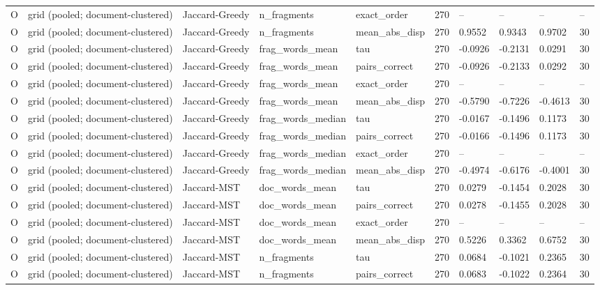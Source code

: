 \begin{table}[t]
{\begin{tabular}{llllllllll}
O & grid (pooled; document-clustered) & Jaccard-Greedy & n\_fragments & exact\_order & 270 & -- & -- & -- & -- \\
O & grid (pooled; document-clustered) & Jaccard-Greedy & n\_fragments & mean\_abs\_disp & 270 & 0.9552 & 0.9343 & 0.9702 & 30 \\
O & grid (pooled; document-clustered) & Jaccard-Greedy & frag\_words\_mean & tau & 270 & -0.0926 & -0.2131 & 0.0291 & 30 \\
O & grid (pooled; document-clustered) & Jaccard-Greedy & frag\_words\_mean & pairs\_correct & 270 & -0.0926 & -0.2133 & 0.0292 & 30 \\
O & grid (pooled; document-clustered) & Jaccard-Greedy & frag\_words\_mean & exact\_order & 270 & -- & -- & -- & -- \\
O & grid (pooled; document-clustered) & Jaccard-Greedy & frag\_words\_mean & mean\_abs\_disp & 270 & -0.5790 & -0.7226 & -0.4613 & 30 \\
O & grid (pooled; document-clustered) & Jaccard-Greedy & frag\_words\_median & tau & 270 & -0.0167 & -0.1496 & 0.1173 & 30 \\
O & grid (pooled; document-clustered) & Jaccard-Greedy & frag\_words\_median & pairs\_correct & 270 & -0.0166 & -0.1496 & 0.1173 & 30 \\
O & grid (pooled; document-clustered) & Jaccard-Greedy & frag\_words\_median & exact\_order & 270 & -- & -- & -- & -- \\
O & grid (pooled; document-clustered) & Jaccard-Greedy & frag\_words\_median & mean\_abs\_disp & 270 & -0.4974 & -0.6176 & -0.4001 & 30 \\
O & grid (pooled; document-clustered) & Jaccard-MST & doc\_words\_mean & tau & 270 & 0.0279 & -0.1454 & 0.2028 & 30 \\
O & grid (pooled; document-clustered) & Jaccard-MST & doc\_words\_mean & pairs\_correct & 270 & 0.0278 & -0.1455 & 0.2028 & 30 \\
O & grid (pooled; document-clustered) & Jaccard-MST & doc\_words\_mean & exact\_order & 270 & -- & -- & -- & -- \\
O & grid (pooled; document-clustered) & Jaccard-MST & doc\_words\_mean & mean\_abs\_disp & 270 & 0.5226 & 0.3362 & 0.6752 & 30 \\
O & grid (pooled; document-clustered) & Jaccard-MST & n\_fragments & tau & 270 & 0.0684 & -0.1021 & 0.2365 & 30 \\
O & grid (pooled; document-clustered) & Jaccard-MST & n\_fragments & pairs\_correct & 270 & 0.0683 & -0.1022 & 0.2364 & 30 \\

\end{tabular}}
\end{table}
